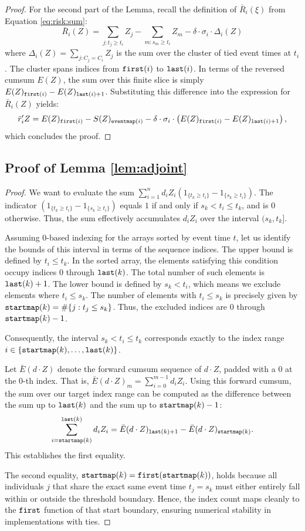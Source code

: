 \documentclass{article}
\begin{document}
\begin{proof}
For the second part of the Lemma, recall the definition of $\bar{R}_i(\xi)$ from Equation \ref{eq:risk:sum}:
$$
\bar{R}_i(Z) = \sum_{j: t_j \geq t_i} Z_j - \sum_{m: s_m \geq t_i} Z_m - \delta \cdot \sigma_i \cdot \Delta_i(Z)
$$
where $\Delta_i(Z) = \sum_{j: C_j=C_i} Z_j$ is the sum over the cluster of tied event times at $t_i$. The cluster spans indices from ${\tt first}(i)$ to ${\tt last}(i)$. In terms of the reversed cumsum $E(Z)$, the sum over this finite slice is simply $E(Z)_{{\tt first}(i)} - E(Z)_{{\tt last}(i)+1}$. Substituting this difference into the expression for $\bar{R}_i(Z)$ yields:
$$
\bar{r}_i'Z = E(Z)_{{\tt first}(i)} - S(Z)_{{\tt eventmap}(i)} - \delta \cdot \sigma_i  \cdot \left( E(Z)_{{\tt first}(i)} - E(Z)_{{\tt last}(i)+1} \right),
$$
which concludes the proof.
\end{proof}

\subsection*{Proof of Lemma \ref{lem:adjoint}}
\begin{proof}
We want to evaluate the sum $\sum_{i=1}^n d_i Z_i (1_{\{t_k \geq t_i\}} - 1_{\{s_k \geq t_i\}})$. The indicator $(1_{\{t_k \geq t_i\}} - 1_{\{s_k \geq t_i\}})$ equals $1$ if and only if $s_k < t_i \leq t_k$, and is $0$ otherwise. Thus, the sum effectively accumulates $d_i Z_i$ over the interval $(s_k, t_k]$.

Assuming 0-based indexing for the arrays sorted by event time $t$, let us identify the bounds of this interval in terms of the sequence indices. 
The upper bound is defined by $t_i \leq t_k$. In the sorted array, the elements satisfying this condition occupy indices $0$ through ${\tt last}(k)$. The total number of such elements is ${\tt last}(k) + 1$.
The lower bound is defined by $s_k < t_i$, which means we exclude elements where $t_i \leq s_k$. The number of elements with $t_i \leq s_k$ is precisely given by ${\tt startmap}(k) = \#\{j : t_j \leq s_k\}$. Thus, the excluded indices are $0$ through ${\tt startmap}(k) - 1$.

Consequently, the interval $s_k < t_i \leq t_k$ corresponds exactly to the index range $i \in \{{\tt startmap}(k), \dots, {\tt last}(k)\}$.

Let $\bar{E}(d \cdot Z)$ denote the forward cumsum sequence of $d \cdot Z$, padded with a $0$ at the 0-th index. That is, $\bar{E}(d \cdot Z)_m = \sum_{i=0}^{m-1} d_i Z_i$.
Using this forward cumsum, the sum over our target index range can be computed as the difference between the sum up to ${\tt last}(k)$ and the sum up to ${\tt startmap}(k)-1$:
$$
\sum_{i={\tt startmap}(k)}^{{\tt last}(k)} d_i Z_i = \bar{E}(d \cdot Z)_{{\tt last}(k)+1} - \bar{E}(d \cdot Z)_{{\tt startmap}(k)}.
$$
This establishes the first equality. 

The second equality, ${\tt startmap}(k) = {\tt first}({\tt startmap}(k))$, holds because all individuals $j$ that share the exact same event time $t_j = s_k$ must either entirely fall within or outside the threshold boundary. Hence, the index count maps cleanly to the ${\tt first}$ function of that start boundary, ensuring numerical stability in implementations with ties.
\end{proof}
\end{document}
